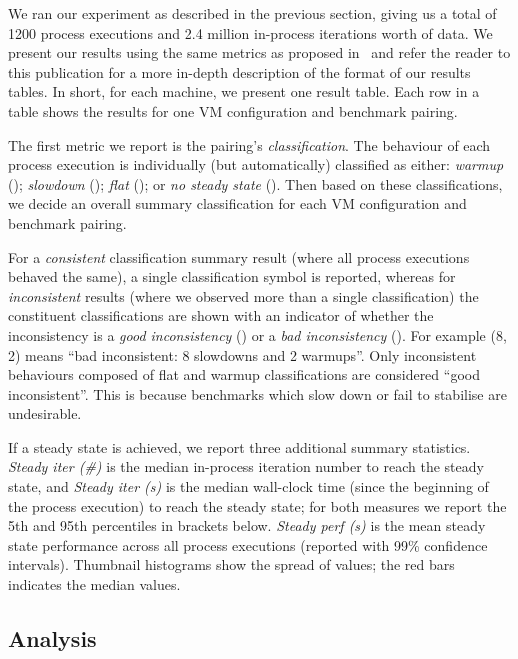 \documentclass[a4paper]{article}
\begin{document}
We ran our experiment as described in the previous section, giving us a total
of 1200 process executions and 2.4 million in-process iterations worth of
data. We present our results using the same metrics as proposed
in~\cite{barrett16warmup} and refer the reader to this publication for a more
in-depth description of the format of our results tables. In short, for each
machine, we present one result table. Each row in a table shows the results for
one VM configuration and benchmark pairing.

The first metric we report is the pairing's \emph{classification}. The
behaviour of each process execution is individually (but automatically) classified as either:
\emph{warmup} (\warmup); \emph{slowdown} (\slowdown); \emph{flat} (\flatc); or
\emph{no steady state} (\nosteadystate). Then based on these classifications,
we decide an overall summary classification for each VM configuration and benchmark
pairing.

For a \emph{consistent} classification summary result (where all process
executions behaved the same), a single classification symbol is reported,
whereas for \emph{inconsistent} results (where we observed more than a single
classification) the constituent classifications are shown with an indicator of
whether the inconsistency is a \emph{good inconsistency} (\goodinconsistent)
or a \emph{bad inconsistency} (\badinconsistent). For example
\badinconsistent(8\slowdown, 2\warmup) means ``bad inconsistent: 8 slowdowns
and 2 warmups''. Only inconsistent behaviours composed of flat and warmup
classifications are considered ``good inconsistent''. This is because
benchmarks which slow down or fail to stabilise are undesirable.

If a steady state is achieved, we report three additional summary statistics.
\emph{Steady iter (\#)} is the median in-process iteration number to reach the
steady state, and \emph{Steady iter (s)} is the median wall-clock time (since
the beginning of the process execution) to reach the steady state; for both
measures we report the 5th and 95th percentiles in brackets below. \emph{Steady perf (s)}
is the mean steady state performance across all process executions (reported
with 99\% confidence intervals). Thumbnail histograms show the spread of
values; the red bars indicates the median values.

\subsection{Analysis}
\end{document}
